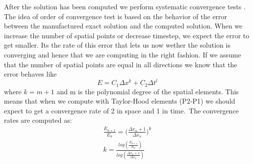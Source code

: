 After the solution has been computed we perform systematic convergence tests \cite{Roache}. The idea of order of convergence test is based on the behavior of the error between the manufactured exact solution and the computed solution. When we increase the number of spatial points or decrease timestep, we expect the error to get smaller. Its the rate of this error that lets us now wether the solution is converging and hence that we are computing in the right fashion.
If we assume that the number of spatial points are equal in all directions we know that the error behaves like
$$ E = C_1 \Delta x^k+ C_2 \Delta t^l $$
where $ k = m+1 $ and m is the polynomial degree of the spatial elements. This means that when we compute with Taylor-Hood elements (P2-P1) we should expect to get a convergence rate of 2 in space and 1 in time.\
The convergence rates are computed as:
\begin{align}
\frac{E_{n+1}}{E_n} = \big( \frac{\Delta x_n+1}{\Delta x_n} \big)^k \\
k = \frac{log( \frac{E_{n+1}}{E_n}) }{ log(\frac{\Delta x_n+1}{\Delta x_n})}
\end{align}





